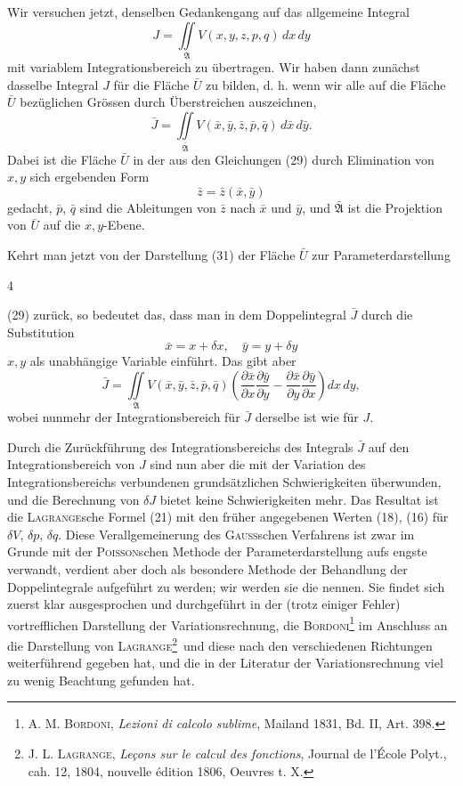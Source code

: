 Wir versuchen jetzt, denselben Gedankengang auf das allgemeine Integral
\[
J=\iint\limits_{\mathfrak{A}}V(x,y,z,p,q)\,dx\,dy
\]
mit variablem Integrationsbereich zu übertragen. Wir haben dann zunächst
dasselbe Integral $J$ für die Fläche $\bar U$ zu bilden, d. h. wenn wir alle auf die
Fläche $\bar U$ bezüglichen Grössen durch Überstreichen auszeichnen,
\[
\bar J=\iint\limits_{\bar{\mathfrak{A}}}V(\bar x,\bar y,\bar z,\bar p,\bar q)\,d\bar x\,d\bar y.
\]
Dabei ist die Fläche $\bar U$ in der aus den Gleichungen (29) durch Elimination
von $x,y$ sich ergebenden Form
\begin{equation*}
\bar z=\bar z(\bar x,\bar y)\tag{31}
\end{equation*}
gedacht, $\bar p$, $\bar q$ sind die Ableitungen von $\bar z$ nach $\bar x$ und $\bar y$, und $\bar{\mathfrak{A}}$ ist die Projektion
von $\bar U$ auf die $x,y$-Ebene.

Kehrt man jetzt von der Darstellung (31) der Fläche $\bar U$ zur Parameterdarstellung
\par\smallskip{}\hfill{\small 4}\par
\clearpage{}
\noindent (29) zurück, so bedeutet das, dass man in dem Doppelintegral $\bar J$
durch die Substitution
\[
\bar x=x+\delta x,\quad\bar y=y+\delta y
\]
$x,y$ als unabhängige Variable einführt. Das gibt aber
\[
\bar J=\iint\limits_{\mathfrak{A}}V(\bar x,\bar y,\bar z,\bar p,\bar q)
\left(\frac{\partial\bar x}{\partial x}\frac{\partial\bar y}{\partial y}-\frac{\partial\bar x}{\partial y}\frac{\partial\bar y}{\partial x}\right)dx\,dy,
\]
wobei nunmehr der Integrationsbereich für $\bar J$ derselbe ist wie für $J$.

Durch die Zurückführung des Integrationsbereichs des Integrals $\bar J$ auf
den Integrationsbereich von $J$ sind nun aber die mit der Variation des Integrationsbereichs
verbundenen grundsätzlichen Schwierigkeiten überwunden, und
die Berechnung von $\delta J$ bietet keine Schwierigkeiten mehr. Das Resultat ist
die \textsc{Lagrange}sche Formel (21) mit den früher angegebenen Werten (18), (16)
für $\delta V$, $\delta p$, $\delta q$. Diese Verallgemeinerung des \textsc{Gauss}schen Verfahrens ist zwar
im Grunde mit der \textsc{Poisson}schen Methode der Parameterdarstellung aufs engste
verwandt, verdient aber doch als besondere Methode der Behandlung der
Doppelintegrale aufgeführt zu werden; wir werden sie die 
nennen. Sie findet sich zuerst klar ausgesprochen und durchgeführt
in der (trotz einiger Fehler) vortrefflichen Darstellung der Variationsrechnung,
die \textsc{Bordoni}\footnote{\textsc{A. M. Bordoni}, \textit{Lezioni di calcolo sublime}, Mailand 1831, Bd. II, Art. 398.} im Anschluss an die Darstellung von \textsc{Lagrange}\begingroup\renewcommand{\thefootnote}{37a)}\footnote{\textsc{J. L. Lagrange}, \textit{Leçons sur le calcul des fonctions}, Journal de l'École Polyt., cah. 12, 1804, nouvelle édition 1806, Oeuvres t. X.}\endgroup\setcounter{footnote}{37}\ und diese
nach den verschiedenen Richtungen weiterführend gegeben hat, und die in
der Literatur der Variationsrechnung viel zu wenig Beachtung gefunden hat.

